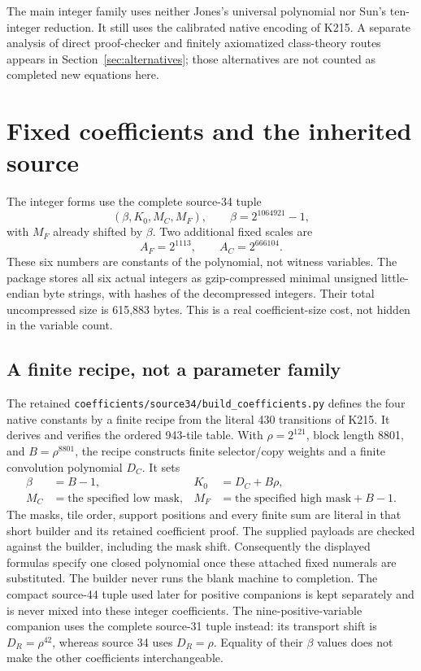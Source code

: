 \documentclass[11pt]{article}
\theoremstyle{remark}\newtheorem{remark}[theorem]{Remark}
\begin{document}
The main integer family uses neither Jones's universal polynomial nor
Sun's ten-integer reduction. It still uses the calibrated native encoding
of K215. A separate analysis of direct proof-checker and finitely
axiomatized class-theory routes appears in Section~\ref{sec:alternatives};
those alternatives are not counted as completed new equations here.

\section{Fixed coefficients and the inherited source}
\label{sec:source}

The integer forms use the complete source-34 tuple
\[
 (\beta,K_0,M_C,M_F),\qquad \beta=2^{1064921}-1,
\]
with $M_F$ already shifted by $\beta$. Two additional fixed scales are
\begin{equation}
 A_F=2^{1113},\qquad A_C=2^{666104}.           \label{eq:scales}
\end{equation}
These six numbers are constants of the polynomial, not witness variables.
The package stores all six actual integers as gzip-compressed minimal
unsigned little-endian byte strings, with hashes of the decompressed
integers. Their total uncompressed size is 615,883 bytes. This is a real
coefficient-size cost, not hidden in the variable count.

\subsection{A finite recipe, not a parameter family}
The retained \texttt{coefficients/source34/build\_coefficients.py} defines
the four native constants by a finite recipe from the literal 430
transitions of K215. It derives and verifies the ordered 943-tile table.
With $\rho=2^{121}$, block length 8801, and $B=\rho^{8801}$, the recipe
constructs finite selector/copy weights and a finite convolution
polynomial $D_C$. It sets
\begin{align*}
 \beta&=B-1,& K_0&=D_C+B\rho,\\
 M_C&=\text{the specified low mask},&
 M_F&=\text{the specified high mask}+B-1.
\end{align*}
The masks, tile order, support positions and every finite sum are literal
in that short builder and its retained coefficient proof. The supplied
payloads are checked against the builder, including the mask shift.
Consequently the displayed formulas specify one closed polynomial once
these attached fixed numerals are substituted. The builder never runs
the blank machine to completion. The compact source-44 tuple used later
for positive companions is kept separately and is never mixed into
these integer coefficients. The nine-positive-variable companion uses
the complete source-31 tuple instead: its transport shift is
$D_R=\rho^{42}$, whereas source 34 uses $D_R=\rho$. Equality of their
$\beta$ values does not make the other coefficients interchangeable.
\end{document}
